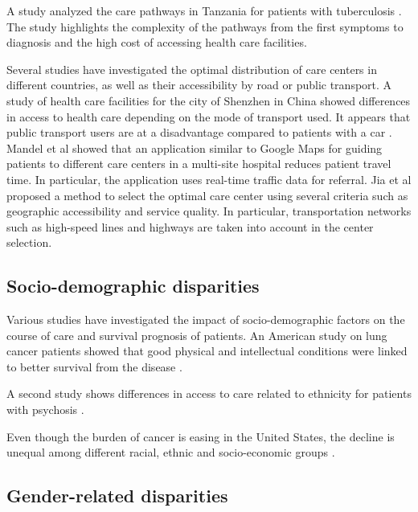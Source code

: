 A study analyzed the care pathways in Tanzania for patients with tuberculosis \cite{mhalu_pathways_2019}. The study highlights the complexity of the pathways from the first symptoms to diagnosis and the high cost of accessing health care facilities.

Several studies have investigated the optimal distribution of care centers in different countries, as well as their accessibility by road or public transport. A study of health care facilities for the city of Shenzhen in China showed differences in access to health care depending on the mode of transport used. It appears that public transport users are at a disadvantage compared to patients with a car \cite{tao_spatial_2018}. Mandel et al \cite{mandel_optimizing_2018} showed that an application similar to Google Maps for guiding patients to different care centers in a multi-site hospital reduces patient travel time. In particular, the application uses real-time traffic data for referral. Jia et al \cite{jia_selecting_2014} proposed a method to select the optimal care center using several criteria such as geographic accessibility and service quality. In particular, transportation networks such as high-speed lines and highways are taken into account in the center selection.

\subsection*{Socio-demographic disparities}

Various studies have investigated the impact of socio-demographic factors on the course of care and survival prognosis of patients. An American study on lung cancer patients showed that good physical and intellectual conditions were linked to better survival from the disease \cite{pierzynski_socio-demographic_2018}.

A second study shows differences in access to care related to ethnicity for patients with psychosis \cite{anderson_meta-analysis_2014}.

Even though the burden of cancer is easing in the United States, the decline is unequal among different racial, ethnic and socio-economic groups \cite{viswanath_science_2005}.

\subsection*{Gender-related disparities}

